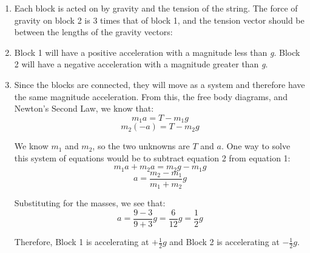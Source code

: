 \begin{Answer}[ref = block1]
\begin{enumerate}
    \item Each block is acted on by gravity and the tension of the string. The force of gravity on block 2 is 3 times that of block 1, and the tension vector should be between the lengths of the gravity vectors:
    \begin{center}
    \end{center}

    \item Block 1 will have a positive acceleration with a magnitude less than \textit{g}. Block 2 will have a negative acceleration with a magnitude greater than \textit{g}.

    \item Since the blocks are connected, they will move as a system and therefore have the same magnitude acceleration. From this, the free body diagrams, and Newton's Second Law, we know that:
    $$m_1 a  = T - m_1 g$$
    $$m_2 \left( - a \right) = T - m_2 g$$

    We know $m_1$ and $m_2$, so the two unknowns are $T$ and $a$. One way to solve this system of equations would be to subtract equation 2 from equation 1:
    $$m_1 a + m_2 a = m_2 g - m_1 g$$
    $$a = \frac{m_2 - m_1}{m_1 + m_2} g$$

    Substituting for the masses, we see that:
    $$a = \frac{9 - 3}{9 + 3}g = \frac{6}{12}g = \frac{1}{2}g$$

    Therefore, Block 1 is accelerating at $+\frac{1}{2}g$ and Block 2 is accelerating at $-\frac{1}{2}g$.
\end{enumerate}
\end{Answer}

